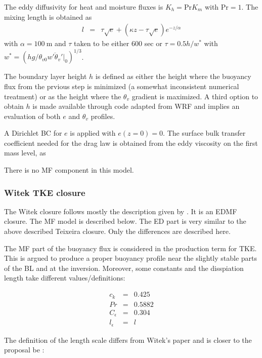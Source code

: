 \documentclass[dvipdfmx,a4paper,10pt]{article}
\begin{document}
The eddy diffusivity for heat and moisture fluxes is $K_h=\mathrm{Pr} K_m$ with $\mathrm{Pr}=1$. The mixing length is obtained as
\begin{eqnarray}
 l &=& \tau \sqrt{e} + (\kappa z - \tau \sqrt{e}) e^{-z/\alpha}
\end{eqnarray}
with $\alpha=100\mathrm{~m}$ and $\tau$ taken to be either 600 sec or $\tau=0.5 h/w^*$ with $w^*=(hg/\theta_{v0} \overline{w'\theta_v'}|_0)^{1/3}$. 

The boundary layer height $h$ is defined as either the height where the buoyancy flux from the prvious step is minimized (a somewhat inconsistent numerical treatment) or as the height where the $\theta_v$ gradient is maximized. A third option to obtain $h$ is made available through code adapted from WRF and implies an evaluation of both $e$ and $\theta_v$ profiles. 

A Dirichlet BC for $e$ is applied with $e(z=0)=0.$ The surface bulk transfer coefficient needed for the drag law is obtained from the eddy viscosity on the first mass level, as


There is no MF component in this model.

\subsubsection{Witek TKE closure}

The Witek closure follows mostly the description given by \cite{witek11}. It is an EDMF closure. The MF model is described below. The ED part is very similar to the above described Teixeira closure. Only the differences are described here.

The MF part of the buoyancy flux is considered in the production term for TKE. This is argued to produce a proper buoyancy profile near the slightly stable parts of the BL and at the inversion. 
Moreover, some constants and the disspiation length take different values/definitions:

\begin{eqnarray}
 c_k&=&0.425\\
 Pr&=&0.5882\\
 C_{\epsilon}&=&0.304\\
 l_{\epsilon}&=&l
\end{eqnarray}

The definition of the length scale differs from Witek's paper and is closer to the proposal be \cite{suselj13}:
\end{document}
